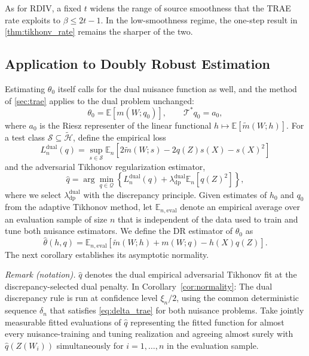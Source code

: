 \documentclass[12pt]{article}
\theoremstyle{plain}
\theoremstyle{definition}
\theoremstyle{remark}
\begin{document}
As for RDIV, a fixed $t$ widens the range of source smoothness that the TRAE rate exploits to $\beta\leqslant2t-1$. In the low-smoothness regime, the one-step result in \cref{thm:tikhonv_rate} remains the sharper of the two.



\subsection{Application to Doubly Robust Estimation}

Estimating $\theta_0$ itself calls for the dual nuisance function as well, and the method of \cref{sec:trae} applies to the dual problem unchanged:
\[
\theta_0=\mathbb E[m(W;q_0)],\qquad \mathcal T^*q_0=a_0,
\]
where $a_{0}$ is the Riesz representer of the linear functional $h\mapsto \mathbb{E}\left[\tilde{m}( W;h)\right]$. For a test class $\mathcal S\subseteq\widetilde{\mathcal H}$, define the empirical loss
\[
L_{n}^{\text{dual}}( q) =\sup_{s\in\mathcal S}\mathbb{E}_{n}\left[ 2\tilde{m}( W;s) -2q(Z) s(X) -s( X)^{2}\right]
\]
and the adversarial Tikhonov regularization estimator,
\[
\hat{q} =\arg\min_{q\in \mathcal{Q}}\left\{ L_{n}^{\text{dual}}( q) +\lambda_{\mathrm{dp}}^{\text{dual}} \mathbb{E}_n[q(Z)^2]\right\} ,
\]
where we select $\lambda_{\mathrm{dp}}^{\text{dual}}$ with the discrepancy principle. Given estimates of $h_{0}$ and $q_{0}$ from the adaptive Tikhonov method, let $\mathbb E_{n,\mathrm{eval}}$ denote an empirical average over an evaluation sample of size $n$ that is independent of the data used to train and tune both nuisance estimators. We define the DR estimator of $\theta_0$ as
\[
\hat{\theta }( h,q) =\mathbb{E}_{n,\mathrm{eval}}\left[\tilde{m}( W;h) +m( W;q) -h( X) q( Z)\right] .
\]
The next corollary establishes its asymptotic normality.

\noindent\textit{Remark (notation).} $\hat q$ denotes the dual empirical adversarial Tikhonov fit at the discrepancy-selected dual penalty. In Corollary~\ref{cor:normality}: The dual discrepancy rule is run at confidence level $\xi_n/2$, using the common deterministic sequence $\delta_n$ that satisfies \eqref{eq:delta_trae} for both nuisance problems. Take jointly measurable fitted evaluations of $\hat q$ representing the fitted function for almost every nuisance-training and tuning realization and agreeing almost surely with $\hat q(Z(W_i))$ simultaneously for $i=1,\ldots,n$ in the evaluation sample.
\end{document}
